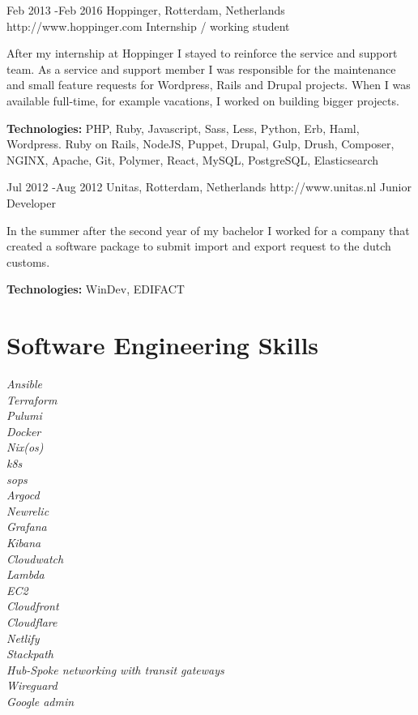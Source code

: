 \documentclass[10pt]{article} %
\begin{document}
\job
{Feb 2013 -}{Feb 2016}
{Hoppinger, Rotterdam, Netherlands}
{http://www.hoppinger.com}
{Internship / working student}
{After my internship at Hoppinger I stayed to reinforce the service and support team. As a service and support member I was responsible for the maintenance and small feature requests for Wordpress, Rails and Drupal projects. When I was available full-time, for example vacations, I worked on building bigger projects.

\rule{0mm}{5mm}\textbf{Technologies:} PHP, Ruby, Javascript, Sass, Less, Python, Erb, Haml, Wordpress. Ruby on Rails, NodeJS, Puppet, Drupal, Gulp, Drush, Composer, NGINX, Apache, Git, Polymer, React, MySQL, PostgreSQL, Elasticsearch
}

\job
{Jul 2012 -}{Aug 2012}
{Unitas, Rotterdam, Netherlands}
{http://www.unitas.nl}
{Junior Developer}
{In the summer after the second year of my bachelor I worked for a company that created a software package to submit import and export request to the dutch customs.

\rule{0mm}{5mm}\textbf{Technologies:} WinDev, EDIFACT
}


\section{Software Engineering Skills}


{
\textit{Ansible}\\
\textit{Terraform}\\
\textit{Pulumi}\\
\textit{Docker}\\
\textit{Nix(os)}\\
\textit{k8s}\\
\textit{sops}\\
\textit{Argocd}\\
\textit{Newrelic}\\
\textit{Grafana}\\
\textit{Kibana}\\
\textit{Cloudwatch}\\
\textit{Lambda}\\
\textit{EC2}\\
\textit{Cloudfront}\\
\textit{Cloudflare}\\
\textit{Netlify}\\
\textit{Stackpath}\\
\textit{Hub-Spoke networking with transit gateways}\\
\textit{Wireguard}\\
\textit{Google admin}\\
}
\end{document}
